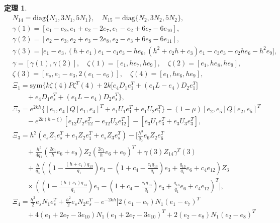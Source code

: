 \documentclass[a4paper, 12pt, oneside]{article}
\theoremstyle{cn_theorem}
\newtheorem{theorem}{定理}[section]
\begin{document}
\begin{theorem}
\begin{align*}
    & N_{14} = \mathrm{diag}\{N_1, 3N_1, 5N_1\}, \quad N_{15} = \mathrm{diag}\{N_2, 3N_2, 5N_2\}, \\
    & \gamma(1) = [e_1 - e_2, e_1 + e_2 - 2e_7, e_1 - e_2 + 6e_7 - 6e_{10}], \\
    & \gamma(2) = [e_2 - e_3, e_2 + e_3 - 2e_8, e_2 - e_3 + 6e_8 - 6e_{11}], \\
    & \gamma(3) = \Big[ e_1 - e_3, (h+c_1)e_1 - c_1 e_3 - h e_6, \nonumber (h^2 + c_2 h + c_3)e_1 - c_3 e_3 - c_2 h e_6 - h^2 e_9 \Big], \\
    & \gamma = [\gamma(1), \gamma(2)], \quad \zeta(1) = [e_1, h e_7, h e_9], \quad \zeta(2) = [e_1, h e_8, h e_9], \\
    & \zeta(3) = [e_s, e_1 - e_3, 2(e_1 - e_6)], \quad \zeta(4) = [e_1, h e_6, h e_9], \\
    & \Xi_1 = \mathrm{sym}\Big\{ k \zeta(4) P \zeta^T(4) + 2k \big[ e_4 D_1 e_1^T + (e_1 L - e_4) D_2 e_1^T \big] \nonumber \\
    & \quad \quad + e_4 D_1 e_s^T + (e_1 L - e_4) D_2 e_s^T \Big\}, \\
    & \Xi_2 = e^{2kh}\Big\{ [e_1, e_4] Q [e_1, e_4]^T + e_1 U_1 e_1^T + e_1 U_2 e_1^T \Big\} - (1-\mu)[e_2, e_5] Q [e_2, e_5]^T \nonumber \\
    & \quad \quad - e^{2k(h-\xi)}[e_{12} U_2 e_{12}^T - e_{12} U_3 e_{12}^T] - [e_3 U_1 e_3^T + e_3 U_3 e_{3}^T], \\
    & \Xi_3 = h^2(e_s Z_1 e_s^T + e_1 Z_2 e_1^T + e_s Z_3 e_s^T) - \Bigg[ \frac{h^3}{q_0} e_6 Z_2 e_6^T \nonumber \\
    & \quad \quad + \frac{h^5}{4q_1} \left( \frac{2c_1}{h} e_6 + e_9 \right) Z_2 \left( \frac{2c_1}{h} e_6 + e_9 \right)^T + \gamma(3) Z_{14} \gamma^T(3) \nonumber \\
    & \quad \quad + \frac{h}{q_3} \left( \left(1 - \frac{(h+c_1)q_{13}}{q_1}\right) e_1 - \left(1+c_4 - \frac{c_1 q_{13}}{q_1}\right) e_3 + \frac{q_{13}}{q_1} e_6 + c_4 e_{12} \right) Z_3 \nonumber \\
    & \quad \quad \times \left( \left(1 - \frac{(h+c_1)q_{13}}{q_1}\right) e_1 - \left(1+c_4 - \frac{c_1 q_{13}}{q_1}\right) e_3 + \frac{q_{13}}{q_1} e_6 + c_4 e_{12} \right)^T \Bigg], \\
    & \Xi_4 = \frac{h^2}{2} e_s N_1 e_s^T + \frac{h^2}{2} e_s N_2 e_s^T - e^{-2kh} \Bigg[ 2(e_1 - e_7) N_1 (e_1 - e_7)^T \nonumber \\
    & \quad \quad + 4(e_1 + 2e_7 - 3e_{10}) N_1 (e_1 + 2e_7 - 3e_{10})^T + 2(e_2 - e_8) N_1 (e_2 - e_8)^T \nonumber \\

\end{align*}
\end{theorem}
\end{document}
